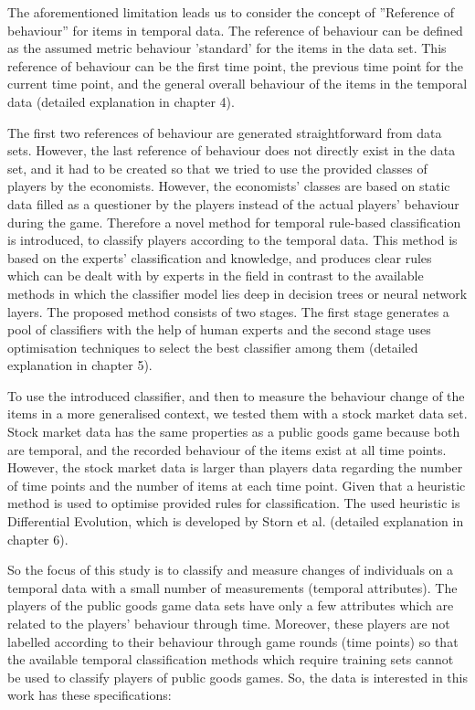 The aforementioned limitation leads us to consider the concept of ''Reference of behaviour'' for items in temporal data. The reference of behaviour can be defined as the assumed metric behaviour 'standard' for the items in the data set. This reference of behaviour can be the first time point, the previous time point for the current time point, and the general overall behaviour of the items in the temporal data (detailed explanation in chapter 4).

The first two references of behaviour are generated straightforward from data sets. However, the last reference of behaviour does not directly exist in the data set, and it had to be created so that we tried to use the provided classes of players by the economists. However, the economists' classes are based on static data filled as a questioner by the players instead of the actual players' behaviour during the game. Therefore a novel method for temporal rule-based classification is introduced, to classify players according to the temporal data. This method is based on the experts' classification and knowledge, and produces clear rules which can be dealt with by experts in the field in contrast to the available methods in which the classifier model lies deep in decision trees or neural network layers. The proposed method consists of two stages. The first stage generates a pool of classifiers with the help of human experts and the second stage uses optimisation techniques to select the best classifier among them (detailed explanation in chapter 5).


To use the introduced classifier, and then to measure the behaviour change of the items in a more generalised context, we tested them with a stock market data set. Stock market data has the same properties as a public goods game because both are temporal, and the recorded behaviour of the items exist at all time points. However, the stock market data is larger than players data regarding the number of time points and the number of items at each time point. Given that a heuristic method is used to optimise provided rules for classification. The used heuristic is Differential Evolution, which is developed by Storn et al. \cite{Storn1997} (detailed explanation in chapter 6).

So the focus of this study is to classify and measure changes of individuals on a temporal data with a small number of measurements (temporal attributes). The players of the public goods game data sets have only a few attributes which are related to the players’ behaviour through time. Moreover, these players are not labelled according to their behaviour through game rounds (time points) so that the available temporal classification methods which require training sets cannot be used to classify players of public goods games. So, the data is interested in this work has these specifications:

